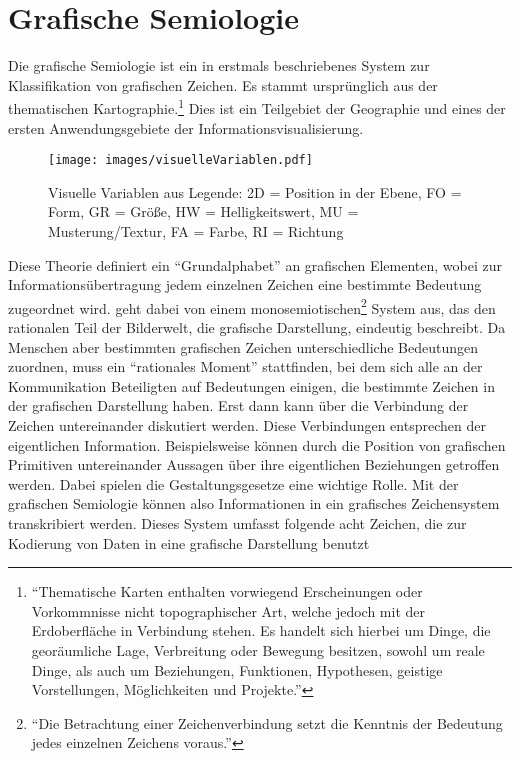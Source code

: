 \documentclass[a4paper, 12pt, DIV=calc, version=first, pdftex, headsepline, footsepline, bibtotocnumbered, liststotocnumbered]{scrreprt}
\begin{document}
\section{Grafische Semiologie}
\label{sec:grafischeSemiologie}
Die grafische Semiologie ist ein in \citep{Bertin} erstmals beschriebenes System zur Klassifikation von grafischen Zeichen.
Es stammt ursprünglich aus der thematischen Kartographie.\footnote{"`Thematische Karten enthalten vorwiegend
Erscheinungen oder Vorkommnisse nicht topographischer Art, welche jedoch mit der Erdoberfläche in Verbindung
stehen. Es handelt sich hierbei um Dinge, die georäumliche Lage, Verbreitung oder Bewegung besitzen, sowohl
um reale Dinge, als auch um Beziehungen, Funktionen, Hypothesen, geistige Vorstellungen, Möglichkeiten und
Projekte."'\citep{Gitta} } Dies ist ein Teilgebiet der Geographie und eines der ersten Anwendungsgebiete der
Informationsvisualisierung.
\begin{figure}
\centering
\texttt{[image: images/visuelleVariablen.pdf]}
\caption{Visuelle Variablen aus \citep[S.\,51]{Bertin} Legende: 2D = Position in der Ebene, FO = Form, GR = Größe,
HW = Helligkeitswert, MU = Musterung/Textur, FA = Farbe, RI = Richtung}
\label{fig:visuelleVariablen}
\end{figure}
Diese Theorie definiert ein "`Grundalphabet"' an grafischen Elementen, wobei zur Informationsübertragung
jedem einzelnen Zeichen eine bestimmte Bedeutung zugeordnet wird. \citep{Bertin} geht dabei von einem
monosemiotischen\footnote{"`Die Betrachtung einer Zeichenverbindung setzt die Kenntnis der Bedeutung jedes
einzelnen Zeichens voraus."'\citep[S.\,3]{Bertin}} System aus, das den rationalen Teil der Bilderwelt, die
grafische Darstellung, eindeutig beschreibt.
Da Menschen aber bestimmten grafischen Zeichen unterschiedliche Bedeutungen zuordnen, muss ein "`rationales Moment"'
stattfinden, bei dem sich alle an der Kommunikation Beteiligten auf Bedeutungen einigen,
die bestimmte Zeichen in der grafischen Darstellung haben. Erst dann kann über die Verbindung der Zeichen untereinander diskutiert
werden. Diese Verbindungen entsprechen der eigentlichen Information. Beispielsweise können
durch die Position von grafischen Primitiven untereinander Aussagen über ihre eigentlichen Beziehungen getroffen werden.
Dabei spielen die Gestaltungsgesetze eine wichtige Rolle.
Mit der grafischen Semiologie können also Informationen in ein grafisches Zeichensystem
transkribiert werden. Dieses System umfasst folgende acht Zeichen, die zur Kodierung von Daten in eine grafische Darstellung benutzt
\end{document}
